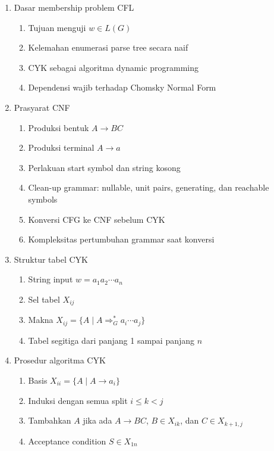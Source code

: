 \begin{enumerate}
    \item \pwajib Dasar membership problem CFL
    \begin{enumerate}
        \item \pwajib Tujuan menguji $w \in L(G)$
        \item \ppaham Kelemahan enumerasi parse tree secara naif
        \item \pwajib CYK sebagai algoritma dynamic programming
        \item \pwajib Dependensi wajib terhadap Chomsky Normal Form
    \end{enumerate}
    \item \pwajib Prasyarat CNF
    \begin{enumerate}
        \item \pwajib Produksi bentuk $A \rightarrow BC$
        \item \pwajib Produksi terminal $A \rightarrow a$
        \item \ppaham Perlakuan start symbol dan string kosong
        \item \pwajib Clean-up grammar: nullable, unit pairs, generating, dan reachable symbols
        \item \pwajib Konversi CFG ke CNF sebelum CYK
        \item \ppaham Kompleksitas pertumbuhan grammar saat konversi
    \end{enumerate}
    \item \pwajib Struktur tabel CYK
    \begin{enumerate}
        \item \pwajib String input $w=a_1a_2\cdots a_n$
        \item \pwajib Sel tabel $X_{ij}$
        \item \pwajib Makna $X_{ij}=\{A\mid A\Rightarrow_G^* a_i\cdots a_j\}$
        \item \ppaham Tabel segitiga dari panjang 1 sampai panjang $n$
    \end{enumerate}
    \item \pwajib Prosedur algoritma CYK
    \begin{enumerate}
        \item \pwajib Basis $X_{ii}=\{A\mid A\rightarrow a_i\}$
        \item \pwajib Induksi dengan semua split $i\leq k<j$
        \item \pwajib Tambahkan $A$ jika ada $A\rightarrow BC$, $B\in X_{ik}$, dan $C\in X_{k+1,j}$
        \item \pwajib Acceptance condition $S\in X_{1n}$

\end{enumerate}
\end{enumerate}
